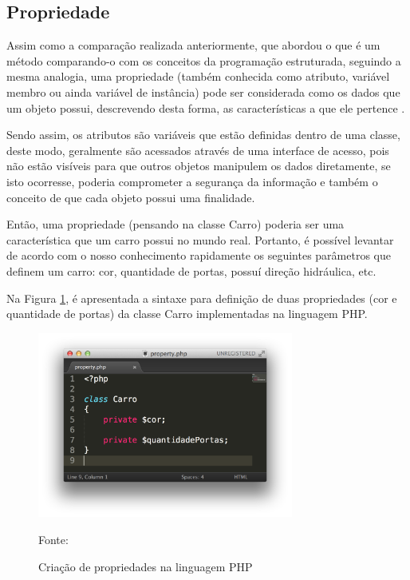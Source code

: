 \subsection{Propriedade}

Assim como a comparação realizada anteriormente, que abordou o que é um método
comparando-o com os conceitos da programação estruturada, seguindo a mesma
analogia, uma propriedade (também conhecida como atributo, variável membro ou ainda variável
de instância) pode ser considerada como os dados que um objeto possui,
descrevendo desta forma, as características a que ele pertence
\cite{programmingPhp}.

Sendo assim, os atributos são variáveis que estão definidas dentro de uma
classe, deste modo, geralmente são acessados através de uma interface de acesso,
pois não estão visíveis para que outros objetos manipulem os dados diretamente,
se isto ocorresse, poderia comprometer a segurança da informação e também o
conceito de que cada objeto possui uma finalidade.

Então, uma propriedade (pensando na classe Carro) poderia ser uma característica
que um carro possui no mundo real. Portanto, é possível levantar de acordo com
o nosso conhecimento rapidamente os seguintes parâmetros que definem um carro:
cor, quantidade de portas, possuí direção hidráulica, etc.

Na Figura \ref{fig:propriedade}, é apresentada a sintaxe para definição de duas
propriedades (cor e quantidade de portas) da classe Carro implementadas na
linguagem \acs{PHP}.

\begin{figure}[h!tb]
	\caption{Criação de propriedades na linguagem PHP}
	\label{fig:propriedade}

	\centering
	\includegraphics[width=0.75\textwidth]{images/property.png}

	\centering
	\footnotesize Fonte: \fonteOAutor
\end{figure}


